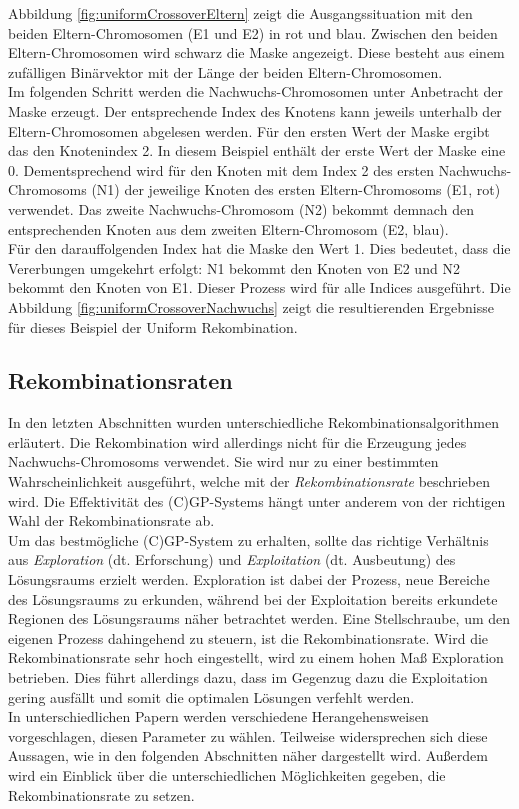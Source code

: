 Abbildung \ref{fig:uniformCrossoverEltern} zeigt die Ausgangssituation mit den beiden Eltern-Chromosomen (E1 und E2) in rot und blau.
Zwischen den beiden Eltern-Chromosomen wird schwarz die Maske angezeigt.
Diese besteht aus einem zufälligen Binärvektor mit der Länge der beiden Eltern-Chromosomen.\\
Im folgenden Schritt werden die Nachwuchs-Chromosomen unter Anbetracht der Maske erzeugt.
Der entsprechende Index des Knotens kann jeweils unterhalb der Eltern-Chro\-mo\-so\-men abgelesen werden.
Für den ersten Wert der Maske ergibt das den Knotenindex 2.
In diesem Beispiel enthält der erste Wert der Maske eine 0.
Dementsprechend wird für den Knoten mit dem Index 2 des ersten Nachwuchs-Chromosoms (N1) der jeweilige Knoten des ersten Eltern-Chromosoms (E1, rot) verwendet.
Das zweite Nachwuchs-Chromosom (N2) bekommt demnach den entsprechenden Knoten aus dem zweiten Eltern-Chromosom (E2, blau).\\
Für den darauffolgenden Index hat die Maske den Wert 1.
Dies bedeutet, dass die Vererbungen umgekehrt erfolgt: N1 bekommt den Knoten von E2 und N2 bekommt den Knoten von E1.
Dieser Prozess wird für alle Indices ausgeführt.
Die Abbildung \ref{fig:uniformCrossoverNachwuchs} zeigt die resultierenden Ergebnisse für dieses Beispiel der Uniform Rekombination.


\subsection{Rekombinationsraten}
\label{subsec:rekombinationsraten}

In den letzten Abschnitten wurden unterschiedliche Rekombinationsalgorithmen erläutert.
Die Rekombination wird allerdings nicht für die Erzeugung jedes Nachwuchs-Chromosoms verwendet.
Sie wird nur zu einer bestimmten Wahrscheinlichkeit ausgeführt, welche mit der \emph{Rekombinationsrate} beschrieben wird.
Die Effektivität des (C)GP-Systems hängt unter anderem von der richtigen Wahl der Rekombinationsrate ab. \cite{hassanat_choosing_2019}\\
Um das bestmögliche (C)GP-System zu erhalten, sollte das richtige Verhältnis aus \emph{Exploration} (dt. Erforschung) und \emph{Exploitation} (dt. Ausbeutung) des Lösungsraums erzielt werden. 
Exploration ist dabei der Prozess, neue Bereiche des Lösungsraums zu erkunden, während bei der Exploitation bereits erkundete Regionen des Lösungsraums näher betrachtet werden.
Eine Stellschraube, um den eigenen Prozess dahingehend zu steuern, ist die Rekombinationsrate. \cite{crepinsek_exploration_2013}
Wird die Rekombinationsrate sehr hoch eingestellt, wird zu einem hohen Maß Exploration betrieben. 
Dies führt allerdings dazu, dass im Gegenzug dazu die Exploitation gering ausfällt und somit die optimalen Lösungen verfehlt werden. \cite{pavai_survey_2017}\\
In unterschiedlichen Papern werden verschiedene Herangehensweisen vorgeschlagen, diesen Parameter zu wählen.
Teilweise widersprechen sich diese Aussagen, wie in den folgenden Abschnitten näher dargestellt wird.
Außerdem wird ein Einblick über die unterschiedlichen Möglichkeiten gegeben, die Rekombinationsrate zu setzen.

